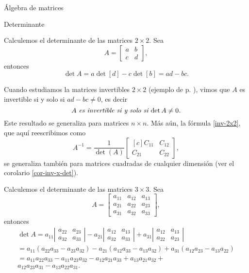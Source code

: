 \begin{chapter}{\'Algebra de matrices}
\begin{section}{Determinante}
    \begin{observacion*} Calculemos el determinante de las matrices $2 \times 2$. Sea 
        $$A=\begin{bmatrix}a&b\\c&d\end{bmatrix},$$  entonces
        $$
        \det A = a \det [d] - c \det [b] = ad-bc.
        $$
        
       Cuando estudiamos la matrices invertibles $2\times 2$ (ejemplo de p. \pageref{inv-2x2-0}), vimos que $A$ es invertible si y solo si $ ad-bc \not=0$,  es decir 
        \begin{equation}
        \text{\textit{$A$ es invertible si y solo si $ \det A \not=0$.}}
        \end{equation}
        Este resultado se generaliza para matrices $n \times n$. Más aún, la fórmula \eqref{inv-2x2},  que aquí reescribimos como
        \begin{equation*}
            A^{-1} = \dfrac{1}{\det(A)}
            \begin{bmatrix*}[c]C_{11}&C_{12}\\C_{21}&C_{22}\end{bmatrix*},
        \end{equation*} se generaliza también para matrices cuadradas de cualquier dimensión (ver el corolario \ref{cor-inv-x-det}).
    \end{observacion*}
    
    
    \begin{observacion*}  Calculemos el determinante de las matrices $3 \times 3$. Sea 
        $$A=\begin{bmatrix}a_{11}&a_{12}&a_{13}\\a_{21}&a_{22}&a_{23}\\a_{31}&a_{32}&a_{33}\end{bmatrix},$$  entonces
        \begin{multline*}
        \det A = a_{11}\left|\begin{matrix}a_{22}&a_{23}\\a_{32}&a_{33}\end{matrix}\right|
        - a_{21}\left|\begin{matrix}a_{12}&a_{13}\\a_{32}&a_{33}\end{matrix}\right|
        + a_{31}\left|\begin{matrix}a_{12}&a_{13}\\a_{22}&a_{23}\end{matrix}\right|\\
        = a_{11}(a_{22}a_{33}- a_{23}a_{32})
        - a_{21}(a_{12}a_{33}-a_{13}a_{32}) 
        + a_{31}(a_{12}a_{23} - a_{13}a_{22}) \\
        =a_{11}a_{22}a_{33}- a_{11}a_{23}a_{32} 
        - a_{12}a_{21}a_{33}+ a_{13}a_{21}a_{32}+ \\
       a_{12}a_{23}a_{31} - a_{13}a_{22}a_{31}.    
        \end{multline*}


\end{observacion*}
\end{section}
\end{chapter}
